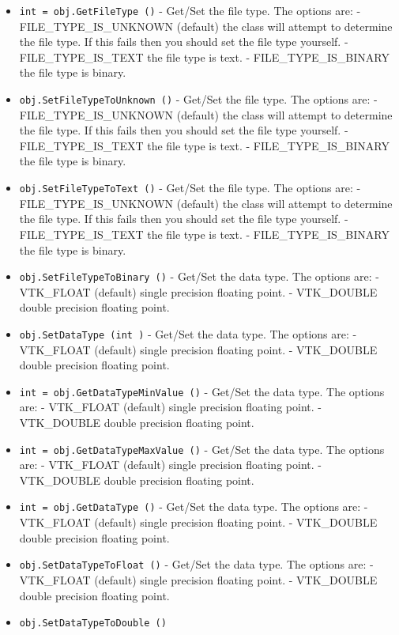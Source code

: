 \begin{itemize}
\item  \verb|int = obj.GetFileType ()| -  Get/Set the file type.  The options are:
 - FILE\_TYPE\_IS\_UNKNOWN (default) the class 
     will attempt to determine the file type.
     If this fails then you should set the file type
     yourself.
 - FILE\_TYPE\_IS\_TEXT the file type is text.
 - FILE\_TYPE\_IS\_BINARY the file type is binary.

\item  \verb|obj.SetFileTypeToUnknown ()| -  Get/Set the file type.  The options are:
 - FILE\_TYPE\_IS\_UNKNOWN (default) the class 
     will attempt to determine the file type.
     If this fails then you should set the file type
     yourself.
 - FILE\_TYPE\_IS\_TEXT the file type is text.
 - FILE\_TYPE\_IS\_BINARY the file type is binary.

\item  \verb|obj.SetFileTypeToText ()| -  Get/Set the file type.  The options are:
 - FILE\_TYPE\_IS\_UNKNOWN (default) the class 
     will attempt to determine the file type.
     If this fails then you should set the file type
     yourself.
 - FILE\_TYPE\_IS\_TEXT the file type is text.
 - FILE\_TYPE\_IS\_BINARY the file type is binary.

\item  \verb|obj.SetFileTypeToBinary ()| -  Get/Set the data type.  The options are:
 - VTK\_FLOAT (default) single precision floating point.
 - VTK\_DOUBLE double precision floating point.

\item  \verb|obj.SetDataType (int )| -  Get/Set the data type.  The options are:
 - VTK\_FLOAT (default) single precision floating point.
 - VTK\_DOUBLE double precision floating point.

\item  \verb|int = obj.GetDataTypeMinValue ()| -  Get/Set the data type.  The options are:
 - VTK\_FLOAT (default) single precision floating point.
 - VTK\_DOUBLE double precision floating point.

\item  \verb|int = obj.GetDataTypeMaxValue ()| -  Get/Set the data type.  The options are:
 - VTK\_FLOAT (default) single precision floating point.
 - VTK\_DOUBLE double precision floating point.

\item  \verb|int = obj.GetDataType ()| -  Get/Set the data type.  The options are:
 - VTK\_FLOAT (default) single precision floating point.
 - VTK\_DOUBLE double precision floating point.

\item  \verb|obj.SetDataTypeToFloat ()| -  Get/Set the data type.  The options are:
 - VTK\_FLOAT (default) single precision floating point.
 - VTK\_DOUBLE double precision floating point.

\item  \verb|obj.SetDataTypeToDouble ()|

\end{itemize}
